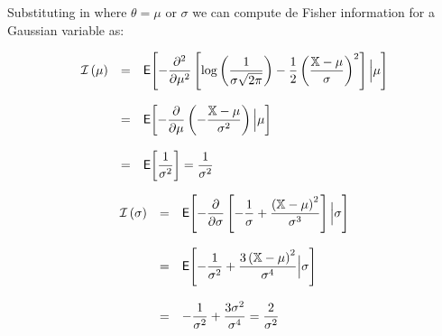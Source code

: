 \noindent Substituting  in  where $\theta = \mu$ or $\sigma$ we can compute de Fisher information for a Gaussian variable as:

\begin{equation}
 \begin{array}{rcl}
  \mathcal{I}\left(\mu\right) &=& \mathsf{E}\!\left[ -\displaystyle\frac{\partial^{2}{}}{\partial{\mu}^{2}}\left[\log\left( \dfrac{1}{\sigma\sqrt{2\pi}} \right) -\dfrac{1}{2} \left( \dfrac{\mathbb{X} - \mu}{\sigma}  \right)^2 \right] \Big| \mu\right]\\ \\
  &=& \mathsf{E}\!\left[-\displaystyle\frac{\partial{}}{\partial{\mu}}\left( - \dfrac{\mathbb{X} - \mu}{\sigma^2} \right) \Big| \mu\right] \\ \\
  &=& \mathsf{E}\!\left[\dfrac{1}{\sigma^2}\right] = \dfrac{1}{\sigma^2}
 \end{array}
\label{FImu}
\end{equation}

\begin{equation}
 \begin{array}{rcl}
  \mathcal{I}\left(\sigma\right) &=& \mathsf{E}\!\left[ -\displaystyle\frac{\partial{}}{\partial{\sigma}}\left[ -\dfrac{1}{\sigma} + \dfrac{\left(\mathbb{X} - \mu  \right)^2}{\sigma^{3}} \right] \Big| \sigma\right]\\ \\
  &=& \mathsf{E}\!\left[-\dfrac{1}{\sigma^{2}} + \dfrac{3\left(\mathbb{X} - \mu  \right)^2}{\sigma^{4}} \Big| \sigma\right] \\ \\
  &=& -\dfrac{1}{\sigma^2} + \dfrac{3\sigma^2}{\sigma^{4}} = \dfrac{2}{\sigma^{2}}
 \end{array}
\label{FImu}
\end{equation}











